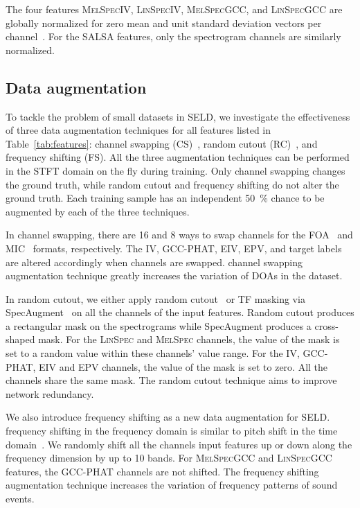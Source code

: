 \documentclass[journal]{IEEEtran}
\begin{document}
The four features \textsc{MelSpecIV}, \textsc{LinSpecIV}, \textsc{MelSpecGCC}, and \textsc{LinSpecGCC} are globally normalized for zero mean and unit standard deviation vectors per channel~\cite{Adavanne2021DCASEInterference}. For the SALSA features, only the spectrogram channels are similarly normalized.

\subsection{Data augmentation}

To tackle the problem of small datasets in SELD, we investigate the effectiveness of three data augmentation techniques for all features listed in Table~\ref{tab:features}: channel swapping (CS)~\cite{Mazzon2019FirstEstimation, Wang2021ADetection}, random cutout (RC)~\cite{Zhong2020RandomAugmentation, Park2019SpecAugment:Recognition}, and frequency shifting (FS). All the three augmentation techniques can be performed in the STFT domain on the fly during training. Only channel swapping changes the ground truth, while random cutout and frequency shifting do not alter the ground truth. Each training sample has an independent \SI{50}{\percent} chance to be augmented by each of the three techniques.  

In channel swapping, there are \num{16} and \num{8} ways to swap channels for the FOA~\cite{Mazzon2019FirstEstimation} and MIC~\cite{Wang2021ADetection} formats, respectively. The IV, GCC-PHAT, EIV, EPV, and target labels are altered accordingly when channels are swapped. channel swapping augmentation technique greatly increases the variation of DOAs in the dataset. 

In random cutout, we either apply random cutout~\cite{Zhong2020RandomAugmentation} or TF masking via SpecAugment~\cite{Park2019SpecAugment:Recognition} on all the channels of the input features. Random cutout produces a rectangular mask on the spectrograms while SpecAugment produces a cross-shaped mask. For the \textsc{LinSpec} and \textsc{MelSpec} channels, the value of the mask is set to a random value within these channels' value range. For the IV, GCC-PHAT, EIV and EPV channels, the value of the mask is set to zero. All the channels share the same mask. The random cutout technique aims to improve network redundancy. 

We also introduce frequency shifting as a new data augmentation for SELD. frequency shifting in  the frequency domain is similar to pitch shift in the time domain~\cite{Salamon2017DeepClassification}. We randomly shift all the channels input features up or down along the frequency dimension by up to \num{10} bands. For \textsc{MelSpecGCC} and \textsc{LinSpecGCC} features, the GCC-PHAT channels are not shifted. The frequency shifting augmentation technique increases the variation of frequency patterns of sound events.  
\end{document}
